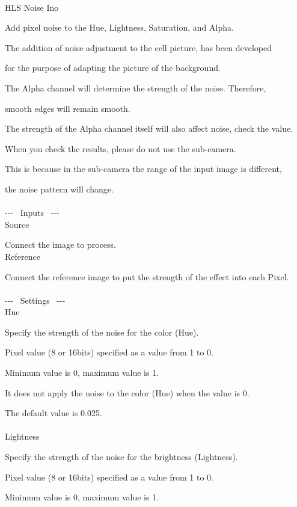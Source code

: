 \documentclass[a4paper,12pt]{article}
\begin{document}
\thispagestyle{empty}

\Large
\noindent \\
HLS Noise Ino\medskip
\par
\normalsize
Add pixel noise to the Hue, Lightness, Saturation, and Alpha.\par
The addition of noise adjustment to the cell picture, has been developed\par
for the purpose of adapting the picture of the background.\\
\par
The Alpha channel will determine the strength of the noise. Therefore,\par
smooth edges will remain smooth.\par
The strength of the Alpha channel itself will also affect noise, check the value.\\
\par
When you check the results, please do not use the sub-camera.\par
This is because in the sub-camera the range of the input image is different,\par
the noise pattern will change.\\
\\
-{-}- \ Inputs \ -{-}-\\
Source\par
Connect the image to process.\\
Reference\par
Connect the reference image to put the strength of the effect into each Pixel.\\
\\
-{-}- \ Settings \ -{-}-\\
Hue\par
Specify the strength of the noise for the color (Hue).\par
Pixel value (8 or 16bits) specified as a value from 1 to 0.\par
Minimum value is 0, maximum value is 1.\par
It does not apply the noise to the color (Hue) when the value is 0.\par
The default value is 0.025.\\
\\
Lightness\par
Specify the strength of the noise for the brightness (Lightness).\par
Pixel value (8 or 16bits) specified as a value from 1 to 0.\par
Minimum value is 0, maximum value is 1.\par
\end{document}
